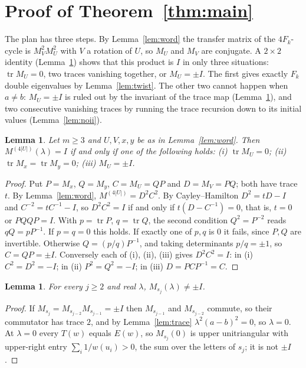 \documentclass[11pt]{amsart}
\newtheorem{lemma}[theorem]{Lemma}
\theoremstyle{definition}
\newcommand{\tr}{\operatorname{tr}}
\begin{document}
\section{Proof of Theorem~\ref{thm:main}}

The plan has three steps. By Lemma~\ref{lem:word} the transfer matrix of the $4F_k$-cycle is $M_V^2M_U^2$ with $V$ a
rotation of $U$, so $M_U$ and $M_V$ are conjugate. A $2\times2$ identity (Lemma~\ref{lem:three}) shows that this
product is $I$ in only three situations: $\tr M_U=0$, two traces vanishing together, or $M_U=\pm I$. The first
gives exactly $F_k$ double eigenvalues by Lemma~\ref{lem:twist}. The other two cannot happen when $a\ne b$: $M_U=\pm I$ is
ruled out by the invariant of the trace map (Lemma~\ref{lem:noiii}), and two consecutive vanishing traces by running
the trace recursion down to its initial values (Lemma~\ref{lem:noii}).

\begin{lemma}\label{lem:three}
Let $m\ge3$ and $U,V,x,y$ be as in Lemma~\ref{lem:word}. Then $M^{(4|U|)}(\lambda)=I$ if and only if one of
the following holds: (i) $\tr M_U=0$; (ii) $\tr M_x=\tr M_y=0$; (iii) $M_U=\pm I$.
\end{lemma}

\begin{proof}
Put $P=M_x$, $Q=M_y$, $C=M_U=QP$ and $D=M_V=PQ$; both have trace $t$. By Lemma~\ref{lem:word},
$M^{(4|U|)}=D^2C^2$. By Cayley--Hamilton $D^2=tD-I$ and $C^{-2}=tC^{-1}-I$, so $D^2C^2=I$ if and only if
$t(D-C^{-1})=0$, that is, $t=0$ or $PQQP=I$. With $p=\tr P$, $q=\tr Q$, the second condition $Q^2=P^{-2}$
reads $qQ=pP^{-1}$. If $p=q=0$ this holds. If exactly one of $p,q$ is $0$ it fails, since $P,Q$ are
invertible. Otherwise $Q=(p/q)P^{-1}$, and taking determinants $p/q=\pm1$, so $C=QP=\pm I$. Conversely each
of (i), (ii), (iii) gives $D^2C^2=I$: in (i) $C^2=D^2=-I$; in (ii) $P^2=Q^2=-I$; in (iii) $D=PCP^{-1}=C$.
\end{proof}

\begin{lemma}\label{lem:noiii}
For every $j\ge2$ and real $\lambda$, $M_{s_j}(\lambda)\ne\pm I$.
\end{lemma}

\begin{proof}
If $M_{s_j}=M_{s_{j-2}}M_{s_{j-1}}=\pm I$ then $M_{s_{j-1}}$ and $M_{s_{j-2}}$ commute, so their commutator has
trace $2$, and by Lemma~\ref{lem:trace} $\lambda^2(a-b)^2=0$, so $\lambda=0$. At $\lambda=0$ every $T(w)$ equals $E(w)$, so
$M_{s_j}(0)$ is upper unitriangular with upper-right entry $\sum_i 1/w(u_i)>0$, the sum over the letters of
$s_j$; it is not $\pm I$.
\end{proof}
\end{document}
